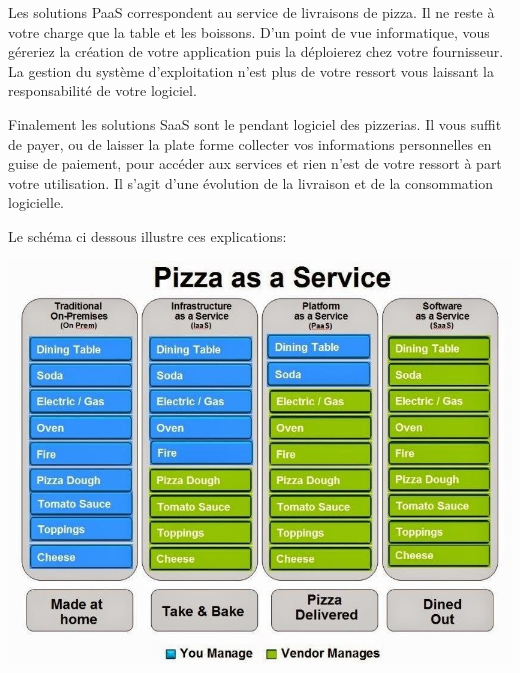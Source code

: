 \documentclass[11pt, a4paper ]{article}
\begin{document}
\begin{spacing}{1.5}
Les solutions PaaS correspondent au service de livraisons de pizza. Il ne reste à votre charge que la table et les boissons. D'un point de vue informatique, vous géreriez la création de votre application puis la déploierez chez votre fournisseur. La gestion du système d'exploitation n'est plus de votre ressort vous laissant la responsabilité de votre logiciel.

Finalement les solutions SaaS sont le pendant logiciel des pizzerias. Il vous suffit de payer, ou de laisser la plate forme collecter vos informations personnelles en guise de paiement, pour accéder aux services et rien n'est de votre ressort à part votre utilisation. Il s'agit d'une évolution de la livraison et de la consommation logicielle.

Le schéma ci dessous illustre ces explications:

\includegraphics[width=\textwidth]{images/PizzaasaService.jpg}



\end{spacing}
\end{document}
